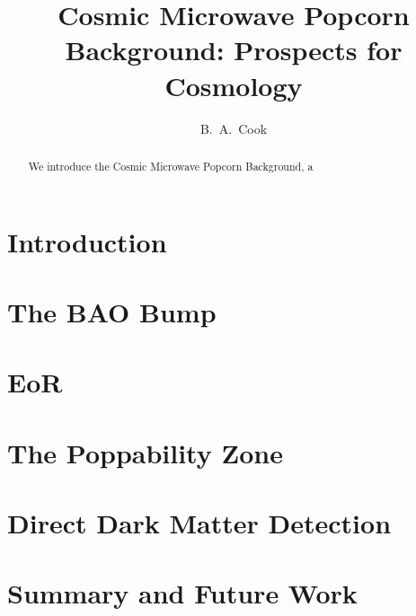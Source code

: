 \documentclass[preprint2,twocolappendix]{aastex6}
\begin{document}
\title{Cosmic Microwave Popcorn Background: Prospects for
  Cosmology}

\author{B.~A.~Cook}

  

\begin{abstract}
We introduce the Cosmic Microwave Popcorn
Background, a 
\end{abstract}

\keywords{}

\section{Introduction}
\label{s.Intro}

\section{The BAO Bump}
\label{s.BAO}

\section{EoR}
\label{s.EoR}

\section{The Poppability Zone}
\label{s.Poppability}

\section{Direct Dark Matter Detection}
\label{s.Dark Matter}

\section{Summary and Future Work}
\label{s.Summary}

%
\end{document}

